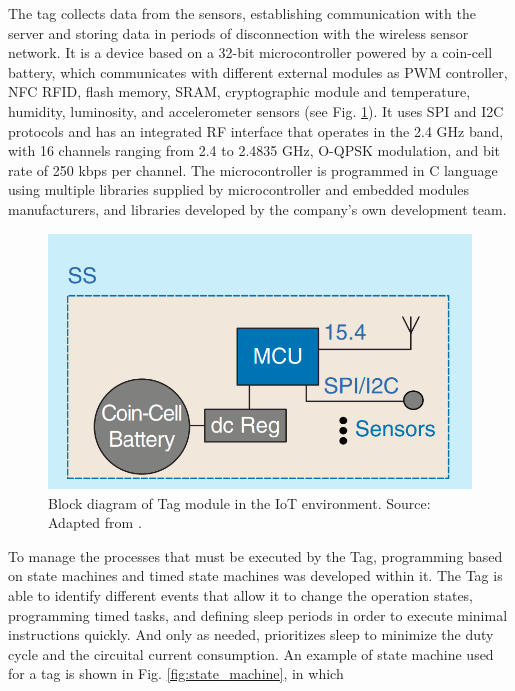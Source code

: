 \documentclass[journal]{IEEEtran}	%
\begin{document}
The tag collects data from the sensors, establishing communication with the server and storing data in periods of disconnection with the wireless sensor network. It is a device based on a 32-bit microcontroller powered by a coin-cell battery, which communicates with different external modules as PWM controller, NFC RFID, flash memory, SRAM, cryptographic module and temperature, humidity, luminosity, and accelerometer sensors (see Fig. \ref{fig:tag}). It uses SPI and I2C protocols and has an integrated RF interface that operates in the 2.4 GHz band, with 16 channels ranging from 2.4 to 2.4835 GHz, O-QPSK modulation, and bit rate of 250 kbps per channel. The microcontroller is programmed in C language using multiple libraries supplied by microcontroller and embedded modules manufacturers, and libraries developed by the company's own development team.

\begin{figure}[t!]
\centering
\includegraphics[width=0.9\columnwidth]{fig3.png}
\caption{Block diagram of Tag module in the IoT environment. Source: Adapted from \cite{williams2017weaving}.}
\label{fig:tag}
\end{figure}

To manage the processes that must be executed by the Tag, programming based on state machines and timed state machines was developed within it. The Tag is able to identify different events that allow it to change the operation states, programming timed tasks, and defining sleep periods in order to execute minimal instructions quickly. And only as needed, prioritizes sleep to minimize the duty cycle and the circuital current consumption. An example of state machine used for a tag is shown in Fig. \ref{fig:state_machine}, in which
\end{document}
